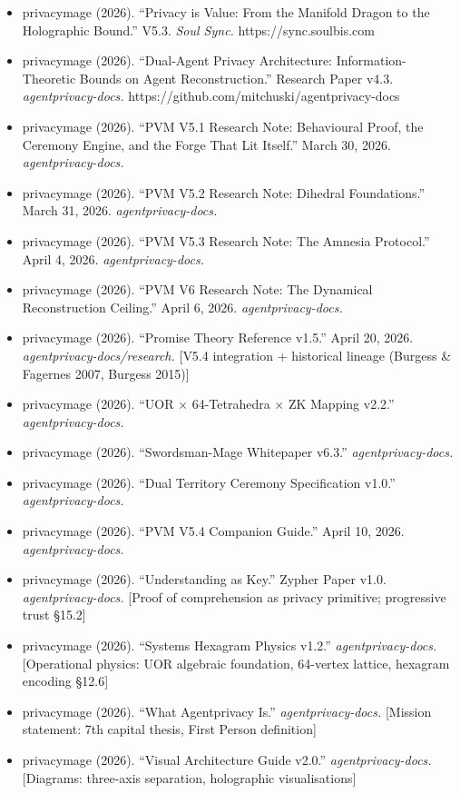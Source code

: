 \documentclass[
]{article}
\providecommand{\tightlist}{%
  \setlength{\itemsep}{0pt}\setlength{\parskip}{0pt}}
\begin{document}
\begin{itemize}
\tightlist
\item
  privacymage (2026). ``Privacy is Value: From the Manifold Dragon to
  the Holographic Bound.'' V5.3. \emph{Soul Sync.}
  https://sync.soulbis.com
\item
  privacymage (2026). ``Dual-Agent Privacy Architecture:
  Information-Theoretic Bounds on Agent Reconstruction.'' Research Paper
  v4.3. \emph{agentprivacy-docs.}
  https://github.com/mitchuski/agentprivacy-docs
\item
  privacymage (2026). ``PVM V5.1 Research Note: Behavioural Proof, the
  Ceremony Engine, and the Forge That Lit Itself.'' March 30, 2026.
  \emph{agentprivacy-docs.}
\item
  privacymage (2026). ``PVM V5.2 Research Note: Dihedral Foundations.''
  March 31, 2026. \emph{agentprivacy-docs.}
\item
  privacymage (2026). ``PVM V5.3 Research Note: The Amnesia Protocol.''
  April 4, 2026. \emph{agentprivacy-docs.}
\item
  privacymage (2026). ``PVM V6 Research Note: The Dynamical
  Reconstruction Ceiling.'' April 6, 2026. \emph{agentprivacy-docs.}
\item
  privacymage (2026). ``Promise Theory Reference v1.5.'' April 20, 2026.
  \emph{agentprivacy-docs/research.} {[}V5.4 integration + historical
  lineage (Burgess \& Fagernes 2007, Burgess 2015){]}
\item
  privacymage (2026). ``UOR × 64-Tetrahedra × ZK Mapping v2.2.''
  \emph{agentprivacy-docs.}
\item
  privacymage (2026). ``Swordsman-Mage Whitepaper v6.3.''
  \emph{agentprivacy-docs.}
\item
  privacymage (2026). ``Dual Territory Ceremony Specification v1.0.''
  \emph{agentprivacy-docs.}
\item
  privacymage (2026). ``PVM V5.4 Companion Guide.'' April 10, 2026.
  \emph{agentprivacy-docs.}
\item
  privacymage (2026). ``Understanding as Key.'' Zypher Paper v1.0.
  \emph{agentprivacy-docs.} {[}Proof of comprehension as privacy
  primitive; progressive trust §15.2{]}
\item
  privacymage (2026). ``Systems Hexagram Physics v1.2.''
  \emph{agentprivacy-docs.} {[}Operational physics: UOR algebraic
  foundation, 64-vertex lattice, hexagram encoding §12.6{]}
\item
  privacymage (2026). ``What Agentprivacy Is.''
  \emph{agentprivacy-docs.} {[}Mission statement: 7th capital thesis,
  First Person definition{]}
\item
  privacymage (2026). ``Visual Architecture Guide v2.0.''
  \emph{agentprivacy-docs.} {[}Diagrams: three-axis separation,
  holographic visualisations{]}
\end{itemize}
\end{document}
